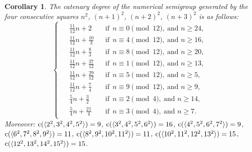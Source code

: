 \documentclass[12pt]{article}
\newtheorem{cor}[thm]{Corollary}
\theoremstyle{remark}
\begin{document}
\begin{cor}\label{corcatenarysquares}
    The catenary degree of the numerical semigroup generated by the four consecutive squares $n^2$, $(n+1)^2$, $(n+2)^2$, $(n+3)^2$ is as follows:
$$
\begin{cases}
\begin{aligned}
&\frac{11}{12}n + 2
    &&\text{if} \ \ n \equiv 0 \pmod{12},\ \text{and } n \ge 24,\\
&\frac{11}{12}n + \frac{10}{3}
    &&\text{if} \ \ n \equiv 4 \pmod{12},\ \text{and } n \ge 16,\\
&\frac{11}{12}n + \frac{8}{3}
    &&\text{if} \ \ n \equiv 8 \pmod{12},\ \text{and } n \ge 20,\\
&\frac{11}{12}n + \frac{37}{12}
    &&\text{if} \ \ n \equiv 1 \pmod{12},\ \text{and } n \ge 13,\\
&\frac{11}{12}n + \frac{29}{12}
    &&\text{if} \ \ n \equiv 5 \pmod{12},\ \text{and } n \ge 5,\\
&\frac{11}{12}n + \frac{7}{4}
    &&\text{if} \ \ n \equiv 9 \pmod{12},\ \text{and } n \ge 9,\\
&\frac{5}{4}n + \frac{3}{2}
    &&\text{if} \ \ n \equiv 2 \pmod{4},\ \text{and } n \ge 14,\\
&\frac{5}{4}n + \frac{21}{4}
    &&\text{if} \ \ n \equiv 3 \pmod{4},\ \text{and } n \ge 7.
\end{aligned}
\end{cases}
    $$
Moreover:   
$\textup{c}(\langle 2^2,3^2,4^2,5^2 \rangle) = 9$, 
$\textup{c}(\langle 3^2,4^2,5^2,6^2 \rangle) = 16$,
 $ \textup{c}(\langle 4^2,5^2,6^2,7^2 \rangle) = 9$,
 $\textup{c}(\langle 6^2,7^2,8^2,9^2 \rangle) = 11$,
 $\textup{c}(\langle 8^2,9^2,10^2,11^2 \rangle) = 11$, 
$\textup{c}(\langle 10^2,11^2,12^2,13^2 \rangle) = 15$,
 $\textup{c}(\langle12^2,13^2,14^2,15^2 \rangle) = 15$.
\end{cor}
\end{document}

